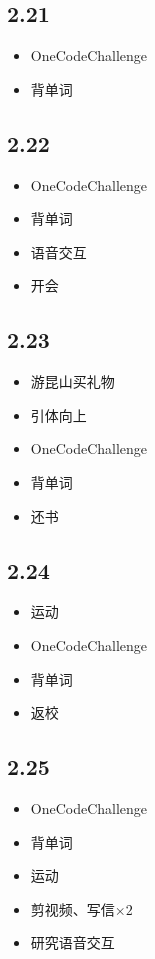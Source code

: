 \documentclass[UTF8]{ctexart}
\begin{document}
\subsection*{2.21}
\begin{itemize}
    \item OneCodeChallenge
    \item 背单词
\end{itemize}

\subsection*{2.22}
\begin{itemize}
    \item OneCodeChallenge
    \item 背单词
    \item 语音交互
    \item 开会
\end{itemize}

\subsection*{2.23}
\begin{itemize}
    \item 游昆山买礼物
    \item 引体向上
    \item OneCodeChallenge
    \item 背单词
    \item 还书
\end{itemize}

\subsection*{2.24}
\begin{itemize}
    \item 运动
    \item OneCodeChallenge
    \item 背单词
    \item 返校
\end{itemize}

\subsection*{2.25}
\begin{itemize}
    \item OneCodeChallenge
    \item 背单词
    \item 运动
    \item 剪视频、写信$\times 2$
    \item 研究语音交互
\end{itemize}
\end{document}
